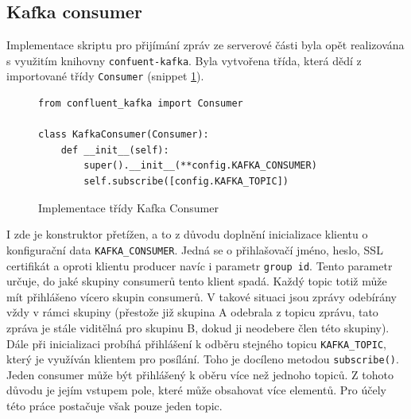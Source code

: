 \documentclass[thesis=M,czech,hidelinks]{FITthesis}[2013/05/06]
\begin{document}
\subsection{Kafka consumer} \label{sec:kafkaconsumer}
Implementace skriptu pro přijímání zpráv ze serverové části byla opět realizována s využitím knihovny \texttt{confuent-kafka}. Byla vytvořena třída, která dědí z importované třídy \texttt{Consumer} (snippet \ref{snip:kafkaconsumer}).
\begin{figure}[h]               
	\begin{verbatim}
from confluent_kafka import Consumer

class KafkaConsumer(Consumer):
    def __init__(self):
        super().__init__(**config.KAFKA_CONSUMER)
        self.subscribe([config.KAFKA_TOPIC])
	\end{verbatim}      
	\caption{Implementace třídy Kafka Consumer}
	\label{snip:kafkaconsumer}
\end{figure}
I zde je konstruktor přetížen, a to z důvodu doplnění inicializace klientu o konfigurační data \texttt{KAFKA_CONSUMER}. Jedná se o přihlašovačí jméno, heslo, SSL certifikát a oproti klientu producer navíc i parametr \texttt{group id}. Tento parametr určuje, do jaké skupiny consumerů tento klient spadá. Každý topic totiž může mít přihlášeno vícero skupin consumerů. V takové situaci jsou zprávy odebírány vždy v rámci skupiny (přestože již skupina A odebrala z topicu zprávu, tato zpráva je stále viditělná pro skupinu B, dokud ji neodebere člen této skupiny). Dále při inicializaci probíhá přihlášení k odběru stejného topicu \texttt{KAFKA_TOPIC}, který je využíván klientem pro posílání. Toho je docíleno metodou \texttt{subscribe()}. Jeden consumer může být přihlášený k oběru více než jednoho topiců. Z tohoto důvodu je jejím vstupem pole, které může obsahovat více elementů. Pro účely této práce postačuje však pouze jeden topic.
\end{document}
